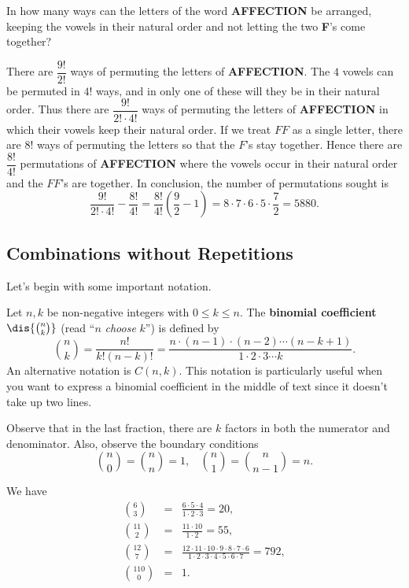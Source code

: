 \begin{exa}
In how many ways can the letters of the word {\bf AFFECTION} be
arranged, keeping the vowels in their natural order and not letting
the two {\bf F}'s come together?
\begin{sol} There are $\dfrac{9!}{2!}$ ways of permuting the letters
of {\bf AFFECTION}. The $4$ vowels can be permuted in  $4!$ ways,
and in only one of these will they be in their natural order. Thus
there are $\dfrac{9!}{2!\cdot 4!}$ ways of permuting the letters of {\bf
AFFECTION} in which their vowels keep their natural order.
If we treat $FF$ as a single letter, there are $8!$ ways of permuting
the letters so that the $F$'s stay together.  Hence there
are $\dfrac{8!}{4!}$ permutations of {\bf AFFECTION} where
the vowels occur in their natural order and the $FF$'s are together.
In conclusion, the number of permutations sought is
$$ \dfrac{9!}{2!\cdot 4!} - \dfrac{8!}{4!} = \dfrac{8!}{4!}\left(\dfrac{9}{2} -1\right) 
= 8\cdot 7\cdot 6 \cdot 5\cdot\dfrac{7}{2}  = 5880.$$
\end{sol}
\end{exa}

\newpage

\subsection{Combinations without Repetitions}
Let's begin with some important notation.

\begin{df}
Let $n, k$ be  non-negative integers with $0\leq k \leq n$. The
{\bf binomial coefficient} $\dis{\binom{n}{k}}$ (read ``$n$ {\em choose} $k$'') is
defined by
$$\binom{n}{k} = \frac{n!}{k!(n - k)!} = \frac{n\cdot (n - 1) \cdot (n - 2) \cdots (n - k + 1)}{1\cdot 2 \cdot 3 \cdots k}.$$
An alternative notation is $C(n,k)$.  This notation is particularly useful when you want to express
a binomial coefficient in the middle of text since it doesn't take up two lines.
\end{df}

\begin{rem}
Observe that in the last fraction, there are $k$ factors in both the
numerator and denominator. Also, observe the boundary conditions
$$\binom{n}{0} = \binom{n}{n} = 1,\ \ \ \ \binom{n}{1} =
\binom{n}{n-1} = n.
$$
\end{rem}

\begin{exa}We have
\begin{eqnarray*}
\binom{6}{3} & =  &\frac{6\cdot 5 \cdot 4}{1\cdot 2 \cdot 3} = 20,  \\
 \binom{11}{2}  & =  & \frac{11\cdot 10}{1\cdot 2 } = 55,  \\ \binom{12}{7} & =  &
 \frac{12\cdot 11 \cdot 10\cdot 9 \cdot 8 \cdot 7
\cdot 6}{1\cdot 2 \cdot 3\cdot 4\cdot 5 \cdot 6 \cdot 7} = 792,  \\
\binom{110}{0} &   =  & 1.
\end{eqnarray*}
\end{exa}

